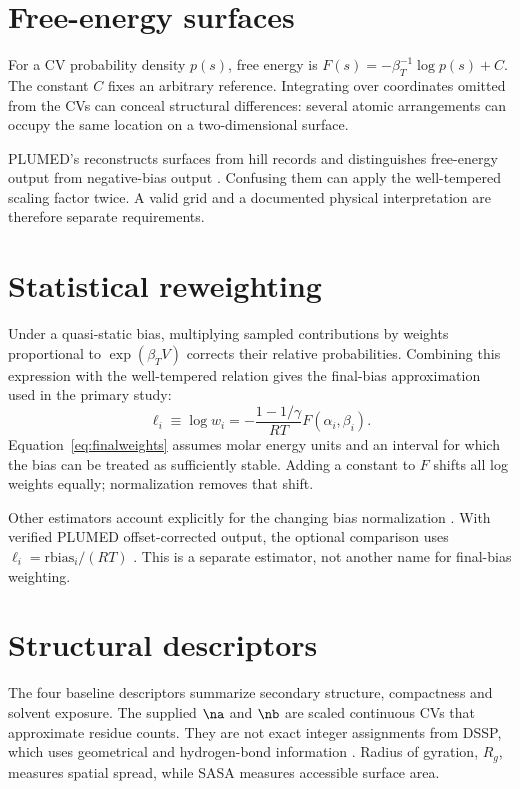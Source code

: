 \section{Free-energy surfaces}
For a CV probability density $p(s)$, free energy is $F(s)=-\beta_T^{-1}\log p(s)+C$. The constant $C$ fixes an arbitrary reference. Integrating over coordinates omitted from the CVs can conceal structural differences: several atomic arrangements can occupy the same location on a two-dimensional surface.

PLUMED's  reconstructs surfaces from hill records and distinguishes free-energy output from negative-bias output \autocite{plumedsum}. Confusing them can apply the well-tempered scaling factor twice. A valid grid and a documented physical interpretation are therefore separate requirements.

\section{Statistical reweighting}
Under a quasi-static bias, multiplying sampled contributions by weights proportional to $\exp(\beta_T V)$ corrects their relative probabilities. Combining this expression with the well-tempered relation gives the final-bias approximation used in the primary study:
\begin{equation}
\ell_i\equiv\log w_i=-\frac{1-1/\gamma}{RT}F(\alpha_i,\beta_i).
\label{eq:finalweights}
\end{equation}
Equation~\ref{eq:finalweights} assumes molar energy units and an interval for which the bias can be treated as sufficiently stable. Adding a constant to $F$ shifts all log weights equally; normalization removes that shift.

Other estimators account explicitly for the changing bias normalization \autocite{bonomi2009,tiwary2015}. With verified PLUMED offset-corrected output, the optional comparison uses $\ell_i=\mathrm{rbias}_i/(RT)$ \autocite{plumedreweight}. This is a separate estimator, not another name for final-bias weighting.

\section{Structural descriptors}
The four baseline descriptors summarize secondary structure, compactness and solvent exposure. The supplied $\na$ and $\nb$ are scaled continuous CVs that approximate residue counts. They are not exact integer assignments from DSSP, which uses geometrical and hydrogen-bond information \autocite{kabsch1983}. Radius of gyration, $R_g$, measures spatial spread, while SASA measures accessible surface area.

